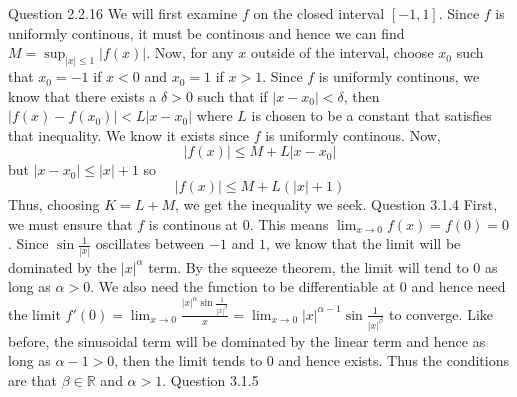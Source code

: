 \documentclass[12pt]{exam}
\begin{document}
\begin{questions}
\question Question 2.2.16 \newline
We will first examine $f$ on the closed interval $[-1,1]$. Since $f$ is uniformly continous, it must be continous and hence we can find $M = \sup_{|x| \leq 1} |f(x)|$. Now, for any $x$ outside of the interval, choose $x_0$ such that $x_0 =-1$ if $x < 0$ and $x_0 = 1$ if $x> 1$. Since $f$ is uniformly continous, we know that there exists a $\delta > 0$ such that if $|x - x_0| < \delta$, then $|f(x) - f(x_0)| < L|x-x_0|$ where $L$ is chosen to be a constant that satisfies that inequality. We know it exists since $f$ is uniformly continous. Now, \[|f(x)| \leq  M + L|x-x_0| \] but $|x-x_0| \leq |x| + 1$ so \[|f(x)| \leq  M + L(|x|+1) \]Thus, choosing $K = L+M$, we get the inequality we seek. 
\question Question 3.1.4\newline
First, we must ensure that $f$ is continous at $0$. This means $\lim_{x \rightarrow 0} f(x) = f(0) = 0$. Since $\sin{\frac{1}{|x|}}$ oscillates between $-1$ and $1$, we know that the limit will be dominated by the $|x|^\alpha$ term. By the squeeze theorem, the limit will tend to $0$ as long as $\alpha > 0$. We also need the function to be differentiable at $0$ and hence need the limit $f'(0) = \lim_{x \rightarrow 0} \frac{|x|^\alpha\sin{\frac{1}{|x|^\beta}}}{x} = \lim_{x \rightarrow 0} |x|^{\alpha-1}\sin{\frac{1}{|x|^\beta}}$ to converge. Like before, the sinusoidal term will be dominated by the linear term and hence as long as $\alpha - 1>0$, then the limit tends to $0$ and hence exists. Thus the conditions are that $\beta \in \mathbb{R}$ and $\alpha > 1$. 
\question Question 3.1.5
\end{questions}
\end{document}
